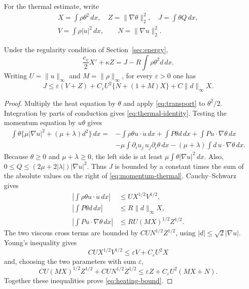 \documentclass[10pt,twoside]{article}
\newcommand{\dd}{\,dx}
\newcommand{\norm}[2]{\lVert#1\rVert_{#2}}
\begin{document}
For the thermal estimate, write
\begin{equation}\label{eq:thermal-notation}
 \begin{gathered}
 X=\int\rho\theta^2\dd,\quad Z=\norm{\nabla\theta}{2}^2,\quad
 J=\int\theta Q\dd,\\
 V=\int\rho|\dot u|^2\dd,\qquad N=\norm{\nabla u}{2}^2.
 \end{gathered}
\end{equation}
\begin{proposition}\label{prop:thermal}
Under the regularity condition of Section~\ref{sec:energy},
\begin{equation}\label{eq:thermal-identity}
 \frac{c_v}{2}X'+\kappa Z=J-R\int\rho\theta^2d\dd.
\end{equation}
Writing $U=\norm{u}{\infty}$ and $M=\norm{\rho}{\infty}$, for every
$\varepsilon>0$ one has
\begin{equation}\label{eq:heating-bound}
 J\le\varepsilon(V+Z)+C_\varepsilon U^2\{N+(1+M)X\}
                  +C\norm{d}{\infty} X.
\end{equation}
\end{proposition}
\begin{proof}
Multiply the heat equation by $\theta$ and apply
\eqref{eq:transport} to $\theta^2/2$. Integration by parts of conduction
gives \eqref{eq:thermal-identity}.
Testing the momentum equation by $u\theta$ gives
\begin{align}
 \int\theta\{\mu|\nabla u|^2+(\mu+\lambda)d^2\}\dd
 ={}&-\int\rho\theta u\cdot\dot u\dd+\int P\theta d\dd
                 +\int Pu\cdot\nabla\theta\dd\nonumber\\
 &-\mu\int\partial_i u_j\,u_j\partial_i\theta\dd
       -(\mu+\lambda)\int d\,u\cdot\nabla\theta\dd.
       \label{eq:momentum-thermal}
\end{align}
Because $\theta\ge0$ and $\mu+\lambda\ge0$, the left side is at least
$\mu\int\theta|\nabla u|^2\dd$. Also,
$0\le Q\le(2\mu+2|\lambda|)|\nabla u|^2$.
Thus $J$ is bounded by a constant times the sum of the absolute values
on the right of \eqref{eq:momentum-thermal}. Cauchy--Schwarz gives
\begin{align*}
 \left|\int\rho\theta u\cdot\dot u\dd\right|
   &\le UX^{1/2}V^{1/2},\\
 \left|\int P\theta d\dd\right|&\le R\norm{d}{\infty} X,\\
 \left|\int Pu\cdot\nabla\theta\dd\right|
   &\le RU(MX)^{1/2}Z^{1/2}.
\end{align*}
The two viscous cross terms are bounded by $CUN^{1/2}Z^{1/2}$,
using $|d|\le\sqrt2|\nabla u|$.
Young's inequality gives
\[
 CUX^{1/2}V^{1/2}\le\varepsilon V+C_\varepsilon U^2X
\]
and, choosing the two parameters with sum $\varepsilon$,
\[
 CU(MX)^{1/2}Z^{1/2}+CUN^{1/2}Z^{1/2}
 \le\varepsilon Z+C_\varepsilon U^2(MX+N).
\]
Together these inequalities prove \eqref{eq:heating-bound}.
\end{proof}
\end{document}
